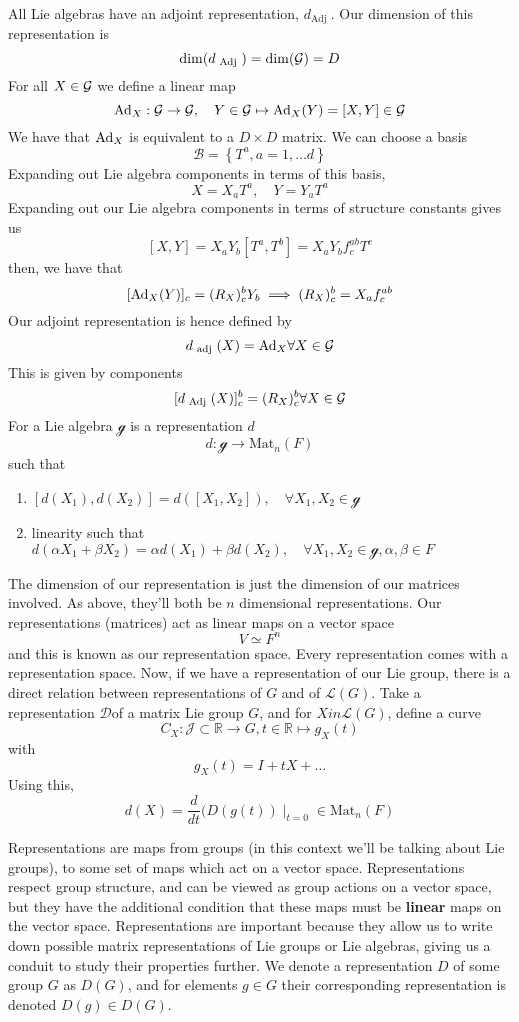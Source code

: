 All Lie algebras have an adjoint representation, $ d_{ \text{Adj }}$. 
Our dimension of this representation is 
\[
	\dim ( d_{ \text{ Adj } } ) = \dim ( \mathcal{ G } )  = D
\]  For all $ X \in \mathcal{ G }  $ we define a linear map 
\[
	\text{Ad}_X : \mathcal{ G } \to \mathcal{ G }, \quad Y \in \mathcal{ G } \mapsto \text{Ad}_ X( Y ) = [ X, Y ] \in \mathcal{ G }
\] We have that $ \text{Ad}_ X$ is equivalent to a $ D \times D $ matrix. 
We can choose a basis 
\[
 \mathcal{ B } = \left\{  T ^ a , a = 1 , \dots d  \right\} 
\] Expanding out Lie algebra components 
in terms of this basis, 
\[
 X = X_ a T ^ a , \quad Y = Y _ a T ^ a 
\] Expanding out our Lie algebra components 
in terms of structure constants 
gives us 
\[
 [ X, Y ] = X_ a Y _ b [ T ^ a, T ^ b ] = X_ a Y _ b f ^{ ab } _ c T ^ c 
\] then, we have that 
\[
 [ \text{Ad} _ X ( Y ) ] _ c  = ( R_ X ) ^ b _ c Y _ b \implies ( R_ X ) ^ b _ c = X_ a f ^{ ab } _ c 
\] Our adjoint representation 
is hence defined by 
\[
	d_{ \text{ adj } } ( X) = \text{Ad} _ X \forall X \in \mathcal{ G }
\] This is given by components 
\[
	[ d_{ \text{ Adj } } ( X) ] ^ b _ c = ( R_ X ) ^ b _ c \forall X \in \mathcal{ G } 
\] 
For a Lie algebra $  \mathcal{ g}$ is a representation $ d $ 
 \[
	 d : \mathcal{ g  } \to \text{Mat}_n ( F )
\]  such that 
\begin{enumerate}
	\item $ [ d( X_1 ) , d ( X_2 ) ] = d ( [ X_1 , X_2 ] ) , \quad \forall X_1, X_2 \in \mathcal{ g }$ 
	\item linearity such that $ d ( \alpha X_1 + \beta X_ 2 ) = \alpha d ( X_1 ) + \beta d ( X_2 ) , \quad \forall X_1, X_2 \in \mathcal{ g } , \alpha , \beta \in F $
\end{enumerate}
The dimension of our representation is just the 
dimension of our matrices involved. 
As above, they'll both be $ n $ dimensional representations.
Our representations (matrices) act as linear maps on a vector space 
\[
 V \simeq F^ n 
\]  and this is known as our representation space. 
Every representation comes with a representation space. 
Now, if we have a representation of our Lie group, 
there is a direct relation between representations of $ G $ and of 
$ \mathcal{ L } ( G ) $. Take a representation $ \mathcal{ D } $of a
matrix Lie group $ G $, and for  $ X in \mathcal{ L } ( G ) $, define a curve
\[
	C_ X : \mathcal{ J } \subset \mathbb{ R} \to G, t \in \mathbb{ R} \mapsto g_X ( t) 
\] with 
\[
 g_X ( t) = I + t X + \dots 
\] Using this, 
\[
	d ( X) = \frac{d }{ dt } ( D ( g ( t ) ) \mid_{ t = 0 } \in \text{Mat}_n ( F) 
\] 


Representations are maps from groups (in this context we'll be talking about Lie groups), to some set of maps which act on a vector space. Representations respect group structure, and can be viewed as group actions on a vector space, but they have the additional condition that these maps must be \textbf{linear} maps on the vector space. Representations are important because they allow us to write down possible matrix representations of Lie groups or Lie algebras, giving us a conduit to study their properties further. We denote a representation $D$ of some group $G$ as $D(G)$, and for elements $g \in G $ their corresponding representation is denoted $D(g) \in D(G)$. 


